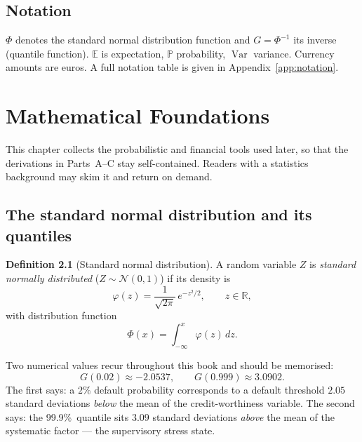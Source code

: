 \documentclass[11pt,a4paper]{report}
\theoremstyle{definition}
\newtheorem{definition}{Definition}[chapter]
\theoremstyle{plain}
\newcommand{\Var}{\operatorname{Var}}
\begin{document}
\section{Notation}

$\Phi$ denotes the standard normal distribution function and
$G = \Phi^{-1}$ its inverse (quantile function). $\mathbb{E}$ is
expectation, $\mathbb{P}$ probability, $\Var$ variance. Currency amounts
are euros. A full notation table is given in
Appendix~\ref{app:notation}.

\chapter{Mathematical Foundations}
\label{chap:foundations}

This chapter collects the probabilistic and financial tools used later,
so that the derivations in Parts~A--C stay self-contained. Readers with
a statistics background may skim it and return on demand.

\section{The standard normal distribution and its quantiles}

\begin{definition}[Standard normal distribution]
A random variable $Z$ is \emph{standard normally distributed}
($Z\sim\mathcal{N}(0,1)$) if its density is
\begin{equation}
  \varphi(z)=\frac{1}{\sqrt{2\pi}}\,e^{-z^{2}/2},\qquad z\in\mathbb{R},
\end{equation}
with distribution function
\begin{equation}
  \Phi(x)=\int_{-\infty}^{x}\varphi(z)\,dz .
\end{equation}
\end{definition}

Two numerical values recur throughout this book and should be memorised:
\begin{equation}
  G(0.02) \approx -2.0537,
  \qquad
  G(0.999) \approx 3.0902 .
\end{equation}
The first says: a $2\%$ default probability corresponds to a default
threshold $2.05$ standard deviations \emph{below} the mean of the
credit-worthiness variable. The second says: the 99.9\%\ quantile sits
$3.09$ standard deviations \emph{above} the mean of the systematic
factor --- the supervisory stress state.
\end{document}
